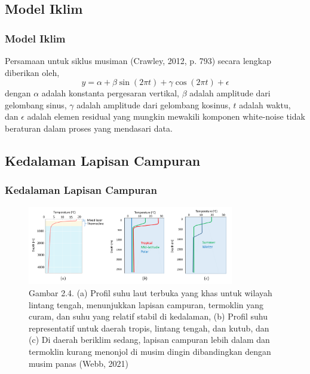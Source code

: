 \documentclass{beamer}
\begin{document}
\subsection{Model Iklim}
\begin{frame}[allowframebreaks]
	\frametitle{Model Iklim}
	Persamaan untuk siklus musiman (Crawley, 2012, p. 793) secara lengkap diberikan oleh,
	\begin{equation}\label{eq:sm}
		y = \alpha + \beta \sin(2\pi t)+\gamma \cos(2\pi t) + \epsilon
	\end{equation}
	dengan $\alpha$ adalah konstanta pergesaran vertikal, $\beta$ adalah amplitude dari gelombang sinus, $\gamma$ adalah amplitude dari gelombang kosinus, $t$ adalah waktu, dan $\epsilon$ adalah elemen residual yang mungkin mewakili komponen white-noise tidak beraturan dalam proses yang mendasari data.	
\end{frame}

\subsection{Kedalaman Lapisan Campuran}
\begin{frame}[allowframebreaks]
	\frametitle{Kedalaman Lapisan Campuran}
		\begin{figure}[H]
		\centering
		\includegraphics[width=9cm]{mld_theory.png}
		\captionsetup{labelformat=empty}
		\caption{Gambar 2.4. (a) Profil suhu laut terbuka yang khas untuk wilayah lintang tengah, menunjukkan lapisan campuran, termoklin yang curam, dan suhu yang relatif stabil di kedalaman, (b) Profil suhu representatif untuk daerah tropis, lintang tengah, dan kutub, dan (c) Di daerah beriklim sedang, lapisan campuran lebih dalam dan termoklin kurang menonjol di musim dingin dibandingkan dengan musim panas (Webb, 2021)}
		\label{fig:mld_theory}
	\end{figure}	
\end{frame}
\end{document}
